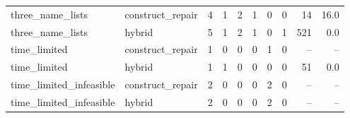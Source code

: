 \begin{table}[tb]
\begin{tabular}{@{}llrrrrrrrr@{}}
three\_name\_lists & construct\_repair & 4 & 1 & 2 & 1 & 0 & 0 & 14 & 16.0 \\
three\_name\_lists & hybrid & 5 & 1 & 2 & 1 & 0 & 1 & 521 & 0.0 \\
time\_limited & construct\_repair & 1 & 0 & 0 & 0 & 1 & 0 & -- & -- \\
time\_limited & hybrid & 1 & 1 & 0 & 0 & 0 & 0 & 51 & 0.0 \\
time\_limited\_infeasible & construct\_repair & 2 & 0 & 0 & 0 & 2 & 0 & -- & -- \\
time\_limited\_infeasible & hybrid & 2 & 0 & 0 & 0 & 2 & 0 & -- & -- \\
\bottomrule\end{tabular}\end{table}

